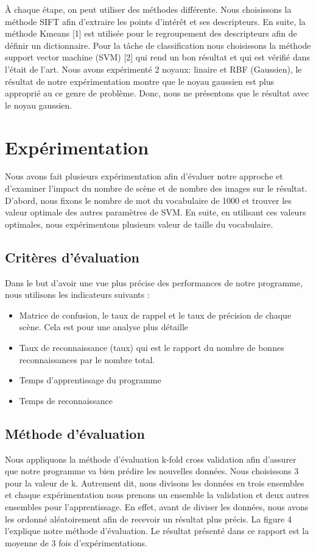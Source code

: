 \documentclass[french,12pt,a4paper,oneside,notitlepage]{report}
\begin{document}
À chaque étape, on peut utiliser des méthodes différente. Nous choisissons la méthode 
SIFT afin d'extraire les points d'intérêt et ses descripteurs. En suite, la méthode 
Kmeans [1] est utilisée pour le regroupement des descripteurs afin de définir un 
dictionnaire.
Pour la tâche de classification nous choisissons la méthode support vector machine (SVM) 
[2] qui rend un bon résultat et qui est vérifié dans l'était de l'art. Nous avons 
expérimenté 2 noyaux: linaire et RBF (Gaussien), le résultat de notre expérimentation 
montre que le noyau gaussien est plus approprié au ce genre de problème. Donc, nous 
ne présentons que le résultat avec le noyau gaussien.

\section{Expérimentation}
Nous avons fait plusieurs expérimentation afin d'évaluer notre approche et d'examiner l'impact du nombre de scène et de
nombre des images sur le résultat. D'abord, nous fixons le nombre de mot du vocabulaire 
de 1000 et trouver les valeur optimale des autres paramètres de SVM. En suite, en 
utilisant ces valeurs optimales, nous expérimentons plusieurs valeur de taille du 
vocabulaire.
\subsection{Critères d'évaluation}
 Dans le but d’avoir une vue plus précise des performances de notre programme, nous 
utilisons  
  les indicateurs suivants :
  \begin{itemize}
   \item Matrice de confusion, le taux de rappel et le taux de précision de chaque scène. 
Cela est pour une analyse plus détaille
  \item Taux de reconnaissance (taux) qui est le rapport du nombre de bonnes 
reconnaissances par 
  le nombre total. 
  \item Temps d'apprentissage du programme
  \item Temps de reconnaissance
  \end{itemize}

\subsection{Méthode d'évaluation}
Nous appliquons la méthode d'évaluation k-fold cross validation afin d'assurer que notre 
programme va bien prédire les nouvelles données. Nous choisissons 3 pour 
la valeur de k. Autrement dit, nous divisons les données en trois ensembles et chaque 
expérimentation nous prenons un ensemble  la validation et deux autres ensembles pour 
l'apprentissage. En effet, avant de diviser les données, nous avons les ordonné 
aléatoirement afin de recevoir un résultat plus précis. La figure 4 l'explique notre 
méthode d'évaluation. Le résultat présenté dans ce rapport est la moyenne de 3 fois 
d'expérimentations.
\end{document}
